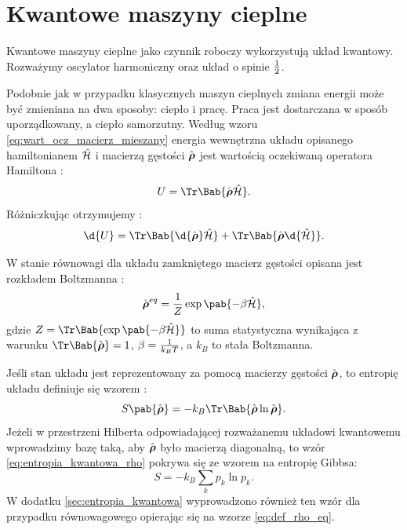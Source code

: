 
\section{Kwantowe maszyny cieplne}
Kwantowe maszyny cieplne jako czynnik roboczy wykorzystują układ kwantowy. 
Rozważymy oscylator harmoniczny oraz układ o spinie \(\frac{1}{2}\).

Podobnie jak w przypadku klasycznych maszyn cieplnych zmiana energii może być zmieniana na dwa sposoby: ciepło i pracę. Praca jest dostarczana w sposób uporządkowany, a ciepło samorzutny. Według wzoru \eqref{eq:wart_ocz_macierz_mieszany} energia wewnętrzna układu opisanego hamiltonianem \(\hat{\mathcal{H}}\) i macierzą gęstości \(\vu{\rho}\) jest wartością oczekiwaną operatora Hamiltona \cite{anders}:
\begin{equation}\label{eq:kwant_energia_wewnetrzna}
	U = \Tr\Bab{\vu{\rho}\ham}.
\end{equation}
Różniczkując otrzymujemy \cite{myers, deffner_quantum_thermodynamics}:
\begin{equation}\label{eq:kwant_energia_wewnetrzna_roz}
	\d{U} = \Tr\Bab{\d{\vu{\rho}}\ham} + \Tr\Bab{\vu{\rho}\d{\ham}}.
\end{equation}

W stanie równowagi dla układu zamkniętego macierz gęstości opisana jest rozkładem Boltzmanna \cite{anders, myers, strasberg, lobejko}:
\begin{equation}\label{eq:def_rho_eq}
	\vu{\rho}^{eq} = \inv{Z} \exp\pab{-\beta\ham},
\end{equation}
gdzie \(Z = \Tr\Bab{\exp\pab{-\beta\ham}}\) to suma statystyczna wynikająca z warunku \(\Tr\Bab{\vu{\rho}} = 1\), \(\beta = \frac{1}{k_B T}\), a \(k_B\) to stała Boltzmanna. 

Jeśli stan układu jest reprezentowany za pomocą macierzy gęstości \(\vu{\rho}\), to entropię układu definiuje się wzorem \cite{rezek, anders, zubariew}:
\begin{equation}\label{eq:entropia_kwantowa_rho}
	S\pab{\vu{\rho}} = - k_B \Tr\Bab{\vu{\rho} \ln \vu{\rho}}.
\end{equation}
Jeżeli w przestrzeni Hilberta odpowiadającej rozważanemu układowi kwantowemu wprowadzimy bazę taką, aby \(\vu{\rho}\) było macierzą diagonalną, to wzór \eqref{eq:entropia_kwantowa_rho} pokrywa się ze wzorem na entropię Gibbsa:
\begin{equation}
	S = - k_B \sum_k p_k \ln p_k.
\end{equation}
W dodatku \ref{sec:entropia_kwantowa} wyprowadzono również ten wzór dla przypadku równowagowego opierając się na wzorze \eqref{eq:def_rho_eq}.

